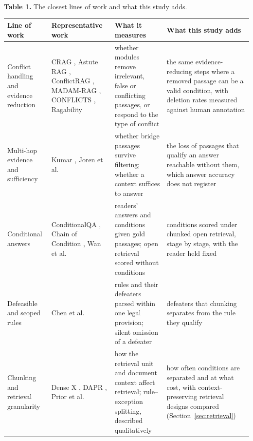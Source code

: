 \begin{table}[!htbp]\centering
\textbf{Table 1.} The closest lines of work and what this study adds.\\\vspace{5pt}
{\fontsize{9}{11}\selectfont
\begin{tabular}{L{2.5cm}L{2.85cm}L{4.4cm}L{4.4cm}}
\toprule
\textbf{Line of work} & \textbf{Representative work} & \textbf{What it measures} & \textbf{What this study adds} \\
\midrule
Conflict handling and evidence reduction & CRAG \cite{yan2024crag}, Astute RAG \cite{wang2025astute}, ConflictRAG \cite{conflictrag2026}, MADAM-RAG \cite{wang2025madam}, CONFLICTS \cite{cattan2025conflicts}, Ragability \cite{gross2026ragability} & whether modules remove irrelevant, false or conflicting passages, or respond to the type of conflict & the same evidence-reducing steps where a removed passage can be a valid condition, with deletion rates measured against human annotation \\
Multi-hop evidence and sufficiency & Kumar \cite{kumar2026verification}, Joren et al.\ \cite{joren2025sufficient} & whether bridge passages survive filtering; whether a context suffices to answer & the loss of passages that qualify an answer reachable without them, which answer accuracy does not register \\
Conditional answers & ConditionalQA \cite{sun2022conditionalqa}, Chain of Condition \cite{lin2024chaincondition}, Wan et al.\ \cite{wan2026retrieverfree} & readers' answers and conditions given gold passages; open retrieval scored without conditions & conditions scored under chunked open retrieval, stage by stage, with the reader held fixed \\
Defeasible and scoped rules & Chen et al.\ \cite{chen2026sgdt} & rules and their defeaters parsed within one legal provision; silent omission of a defeater & defeaters that chunking separates from the rule they qualify \\
Chunking and retrieval granularity & Dense X \cite{chen2024densex}, DAPR \cite{wang2024dapr}, Prior et al.\ \cite{prior2026chunking} & how the retrieval unit and document context affect retrieval; rule--exception splitting, described qualitatively & how often conditions are separated and at what cost, with context-preserving retrieval designs compared (Section~\ref{sec:retrieval}) \\
\bottomrule
\end{tabular}
}
\end{table}
